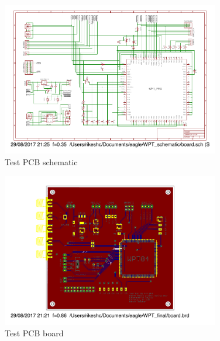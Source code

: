 \documentclass[UKenglish]{ifimaster}  %
\begin{document}
\begin{appendices}
\begin{figure} [!htbp]	%
 	\centering
  	\includegraphics[width=0.85\textwidth]{appendix/pcb_schematic.pdf} 
 	\caption{Test PCB schematic} 
	\label{fig:appen_schemtic_pcb} 
\end{figure}

\begin{figure} [!htbp]	%
 	\centering
  	\includegraphics[width=0.85\textwidth]{appendix/pcb_board.pdf} 
 	\caption{Test PCB board} 
	\label{fig:appen_board_pcb} 
\end{figure}


\end{appendices} %

\backmatter{}	%

\nocite{*}
\printbibliography

\newpage
\printnoidxglossaries
\end{document}

